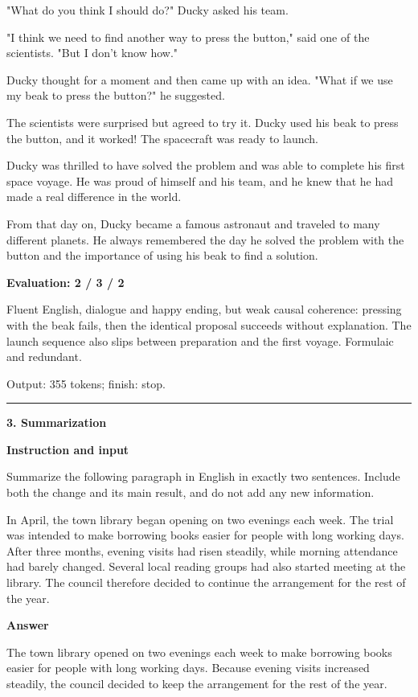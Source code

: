 \documentclass[10pt]{article}
\begin{document}
{\begin{minipage}{\textwidth}
\par\smallskip
"What do you think I should do?" Ducky asked his team.
\par\smallskip
"I think we need to find another way to press the button," said one of the scientists. "But I don't know how."
\par\smallskip
Ducky thought for a moment and then came up with an idea. "What if we use my beak to press the button?" he suggested.
\par\smallskip
The scientists were surprised but agreed to try it. Ducky used his beak to press the button, and it worked! The spacecraft was ready to launch.
\par\smallskip
Ducky was thrilled to have solved the problem and was able to complete his first space voyage. He was proud of himself and his team, and he knew that he had made a real difference in the world.
\par\smallskip
From that day on, Ducky became a famous astronaut and traveled to many different planets. He always remembered the day he solved the problem with the button and the importance of using his beak to find a solution.\par\smallskip
\textbf{Evaluation: 2 / 3 / 2}\par Fluent English, dialogue and happy ending, but weak causal coherence: pressing with the beak fails, then the identical proposal succeeds without explanation. The launch sequence also slips between preparation and the first voyage. Formulaic and redundant.
\par {\color{gray} Output: 355 tokens; finish: stop.}\par
\medskip\hrule\smallskip
{\bfseries 3. Summarization}\par\smallskip
\textbf{Instruction and input}\par Summarize the following paragraph in English in exactly two sentences. Include both the change and its main result, and do not add any new information.
\par\smallskip
In April, the town library began opening on two evenings each week. The trial was intended to make borrowing books easier for people with long working days. After three months, evening visits had risen steadily, while morning attendance had barely changed. Several local reading groups had also started meeting at the library. The council therefore decided to continue the arrangement for the rest of the year.\par\smallskip
\textbf{Answer}\par The town library opened on two evenings each week to make borrowing books easier for people with long working days. Because evening visits increased steadily, the council decided to keep the arrangement for the rest of the year.\par\smallskip

\end{minipage}}
\end{document}
